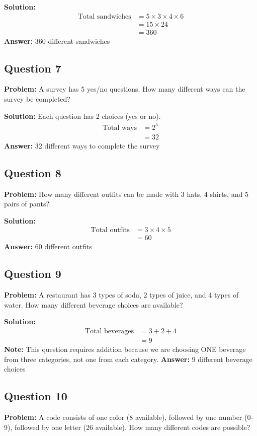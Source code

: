 \documentclass[12pt]{article}
\begin{document}
\textbf{Solution:}
\begin{align*}
\text{Total sandwiches} &= 5 \times 3 \times 4 \times 6 \\
&= 15 \times 24 \\
&= 360
\end{align*}
\textbf{Answer:} 360 different sandwiches

\subsection*{Question 7}
\textbf{Problem:} A survey has 5 yes/no questions. How many different ways can the survey be completed?

\textbf{Solution:} Each question has 2 choices (yes or no).
\begin{align*}
\text{Total ways} &= 2^5 \\
&= 32
\end{align*}
\textbf{Answer:} 32 different ways to complete the survey

\subsection*{Question 8}
\textbf{Problem:} How many different outfits can be made with 3 hats, 4 shirts, and 5 pairs of pants?

\textbf{Solution:}
\begin{align*}
\text{Total outfits} &= 3 \times 4 \times 5 \\
&= 60
\end{align*}
\textbf{Answer:} 60 different outfits

\subsection*{Question 9}
\textbf{Problem:} A restaurant has 3 types of soda, 2 types of juice, and 4 types of water. How many different beverage choices are available?

\textbf{Solution:}
\begin{align*}
\text{Total beverages} &= 3 + 2 + 4 \\
&= 9
\end{align*}
\textbf{Note:} This question requires addition because we are choosing ONE beverage from three categories, not one from each category.
\textbf{Answer:} 9 different beverage choices

\subsection*{Question 10}
\textbf{Problem:} A code consists of one color (8 available), followed by one number (0-9), followed by one letter (26 available). How many different codes are possible?
\end{document}

